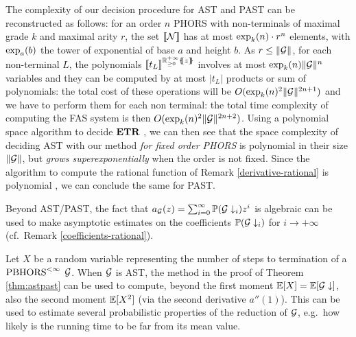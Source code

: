 \begin{remark}
The complexity of our decision procedure for AST and PAST can be reconstructed 
as follows:
for an order $n$ PHORS with non-terminals of maximal grade $k$ and maximal arity $r$, the set $\llbracket\mathcal{N}\rrbracket$ has at most $\exp_{k}({n}) \cdot r^n $ elements, with $\exp_{a}({b})$ the tower of exponential of base $a$ and height $b$. As $r\leq\|\mathcal{G}\|$, for each non-terminal $L$, 
%
%
the polynomials $\llbracket t_L\rrbracket^{{\mathbb{R}^{+\infty}_{\geq 0}}\{\!\!\{z\}\!\!\}}$ involves at most $\exp_{k}({n}) \| \mathcal{G}\|^n$ variables and they can be computed by at most $|t_L|$ products or sum of polynomials: the total cost of these operations will be $O(\exp_{k}({n})^2 \| \mathcal{G} \|^{2n+1})$ and we have to perform them for each non terminal: the total time complexity of computing the FAS system is then $O(\exp_{k}({n})^2 \| \mathcal{G} \|^{2n+2})$. Using a polynomial space algorithm to decide $\mathbf{ETR}$ \cite{DBLP:journals/jacm/EtessamiY09}, we can then see that the space complexity of deciding AST with our method \emph{for fixed order PHORS} is polynomial  in their size $\|\mathcal{G} \|$, but \emph{grows superexponentially} when the order is not fixed. Since the algorithm to compute the rational function of Remark \ref{derivative-rational} is polynomial \cite{CHUDNOVSKY1986271}, we can conclude the same for PAST.
%
%
%
\end{remark}
%
\begin{remark}
Beyond AST/PAST, the fact that $a_{\mathcal{G}}(z)=\sum^{\infty}_{i=0} \mathbb P(\mathcal{G}\downarrow_i)z^i$ is algebraic 
can be used to make asymptotic estimates on the  coefficients $\mathbb P(\mathcal{G}\downarrow_i)$ for $i \to + \infty$ 
(cf.~Remark \ref{coefficients-rational}).
\end{remark}

\begin{remark}
Let $X$ be a random variable representing the number of steps to termination of a $\text{PBHORS}^{<\infty}$ $\mathcal{G}$.
When $\mathcal{G}$ is AST, the method in the proof of Theorem \ref{thm:astpast} can be used to compute, beyond the first moment $\mathbb{E}[X]=\mathbb{E}[\mathcal{G}\downarrow]$, also the second moment $\mathbb{E}[X^2]$ (via the second derivative $a''(1)$). This can be used to estimate several probabilistic properties of the reduction of $\mathcal{G}$, e.g.~how likely is the running time to be far from its mean value.
\end{remark}



